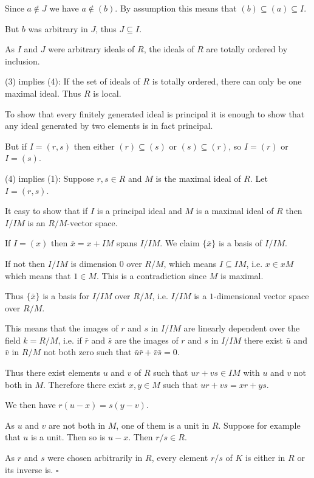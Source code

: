 \documentclass[10pt]{article}
\newcommand{\qed}{\square}
\begin{document}
Since $a \notin J$ we have $a \notin (b)$. By assumption this means that $(b) \subseteq (a) \subseteq I$. 

But $b$ was arbitrary in $J$, thus $J \subseteq I$.

As $I$ and $J$ were arbitrary ideals of $R$, the ideals of $R$ are totally ordered by inclusion.

(3) implies (4): If the set of ideals of $R$ is totally ordered, there can only be one maximal ideal. Thus $R$ is local. 

To show that every finitely generated ideal is principal it is enough to show that any ideal generated by two elements is in fact principal. 

But if $I = (r, s)$ then either $(r) \subseteq (s)$ or $(s) \subseteq (r)$, so $I = (r)$ or $I = (s)$.

(4) implies (1): Suppose $r, s \in R$ and $M$ is the maximal ideal of $R$. Let $I = (r, s)$.

It easy to show that if $I$ is a principal ideal and $M$ is a maximal ideal of $R$ then $I/IM$ is an $R/M$-vector space. 

If $I = (x)$ then $\bar{x} = x + IM$ spans $I/IM$. We claim $\{\bar{x}\}$ is a basis of $I/IM$.

If not then $I/IM$ is dimension $0$ over $R/M$, which means $I \subseteq IM$, i.e. $x \in xM$ which means that $1 \in M$. This is a contradiction since $M$ is maximal.

Thus $\{\bar{x}\}$ is a basis for $I/IM$ over $R/M$, i.e. $I/IM$ is a $1$-dimensional vector space over $R/M$.

This means that the images of $r$ and $s$ in $I/IM$ are linearly dependent over the field $k = R/M$, i.e. if $\bar{r}$ and $\bar{s}$ are the images of $r$ and $s$ in $I/IM$ there exist $\bar{u}$ and $\bar{v}$ in $R/M$ not both zero such that $\bar{u}\bar{r} + \bar{v}\bar{s} = 0$.

Thus there exist elements $u$ and $v$ of $R$ such that $ur + vs \in IM$ with $u$ and $v$ not both in $M$. Therefore there exist $x, y \in M$ such that $ur + vs = xr + ys$.

We then have $r(u - x) = s(y - v)$.

As $u$ and $v$ are not both in $M$, one of them is a unit in $R$. Suppose for example that $u$ is a unit. Then so is $u - x$. Then $r/s \in R$.

As $r$ and $s$ were chosen arbitrarily in $R$, every element $r/s$ of $K$ is either in $R$ or its inverse is. $\qed$
\end{document}
